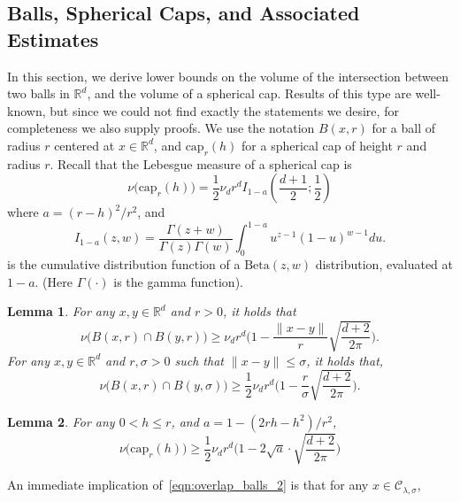 \documentclass{article}
\newcommand{\Reals}{\mathbb{R}}
\newcommand{\1}{\mathbf{1}}
\newcommand{\Rd}{\Reals^d}
\newcommand{\mc}[1]{\mathcal{#1}}
\newtheorem{lemma}{Lemma}[section]
\theoremstyle{definition}
\theoremstyle{remark}
\begin{document}
\subsection{Balls, Spherical Caps, and Associated Estimates}
\label{subsec:spherical_caps}
In this section, we derive lower bounds on the volume of the intersection between two balls in $\Rd$, and the volume of a spherical cap. Results of this type are well-known, but since we could not find exactly the statements we desire, for completeness we also supply proofs. We use the notation $B(x,r)$ for a ball of radius $r$ centered at $x \in \Rd$, and $\mathrm{cap}_{r}(h)$ for a spherical cap of height $r$ and radius $r$. Recall that the Lebesgue measure of a spherical cap is
\begin{equation*}
\nu\bigl(\mathrm{cap}_r(h)\bigr) = \frac{1}{2} \nu_d r^d I_{1 - a}\left(\frac{d + 1}{2}; \frac{1}{2}\right)
\end{equation*}
where $a = (r - h)^2/r^2$, and
\begin{equation*}
I_{1 - a}(z,w) = \frac{\Gamma(z + w)}{\Gamma(z) \Gamma(w)} \int_{0}^{1 - a} u^{z - 1} (1 - u)^{w - 1} du.
\end{equation*}
is the cumulative distribution function of a $\mathrm{Beta}(z,w)$ distribution, evaluated at $1 - a$. (Here $\Gamma(\cdot)$ is the gamma function).
\begin{lemma}
	\label{lem:overlap_balls}
	For any $x,y \in \Rd$ and $r > 0$, it holds that
	\begin{equation}
	\label{eqn:overlap_balls_1}
	\nu\bigl(B(x,r) \cap B(y,r)\bigr) \geq \nu_d r^d\biggl(1 - \frac{\|x - y\|}{r} \sqrt{\frac{d + 2}{2\pi}}\biggr).
	\end{equation}
	For any $x,y \in \Rd$ and $r,\sigma > 0$ such that $\|x - y\| \leq \sigma$, it holds that,
	\begin{equation}
	\label{eqn:overlap_balls_2}
	\nu\bigl(B(x,r) \cap B(y,\sigma)\bigr) \geq \frac{1}{2} \nu_d r^d\biggl(1 - \frac{r}{\sigma}\sqrt{\frac{d + 2}{2\pi}}\biggr).
	\end{equation}
\end{lemma}
\begin{lemma}
	\label{lem:volume_of_spherical_cap}
	For any $0 < h \leq r$, and $a = 1 - (2 r h - h^2)/r^2$,
	\begin{equation*}
	\nu\bigl(\mathrm{cap}_r(h)\bigr) \geq \frac{1}{2}\nu_dr^d\bigl(1 - 2\sqrt{a} \cdot \sqrt{\frac{d + 2}{2\pi}}\bigr)
	\end{equation*}
\end{lemma}
An immediate implication of~\eqref{eqn:overlap_balls_2} is that for any $x \in \mc{C}_{\lambda,\sigma}$,
\end{document}
